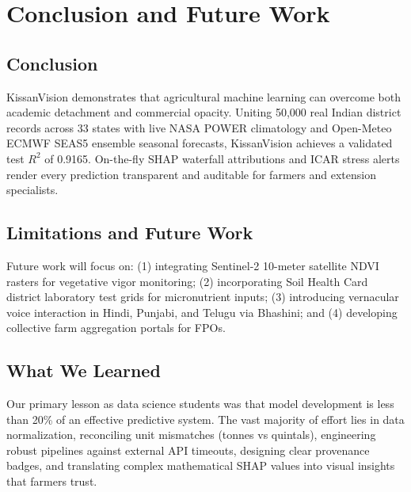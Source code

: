 \documentclass[11pt,a4paper]{report}
\begin{document}
\chapter{Conclusion and Future Work}

\section{Conclusion}
KissanVision demonstrates that agricultural machine learning can overcome both academic detachment and commercial opacity. Uniting 50,000 real Indian district records across 33 states with live NASA POWER climatology and Open-Meteo ECMWF SEAS5 ensemble seasonal forecasts, KissanVision achieves a validated test $R^2$ of 0.9165. On-the-fly SHAP waterfall attributions and ICAR stress alerts render every prediction transparent and auditable for farmers and extension specialists.

\section{Limitations and Future Work}
Future work will focus on: (1) integrating Sentinel-2 10-meter satellite NDVI rasters for vegetative vigor monitoring; (2) incorporating Soil Health Card district laboratory test grids for micronutrient inputs; (3) introducing vernacular voice interaction in Hindi, Punjabi, and Telugu via Bhashini; and (4) developing collective farm aggregation portals for FPOs.

\section{What We Learned}
Our primary lesson as data science students was that model development is less than 20\% of an effective predictive system. The vast majority of effort lies in data normalization, reconciling unit mismatches (tonnes vs quintals), engineering robust pipelines against external API timeouts, designing clear provenance badges, and translating complex mathematical SHAP values into visual insights that farmers trust.
\end{document}
